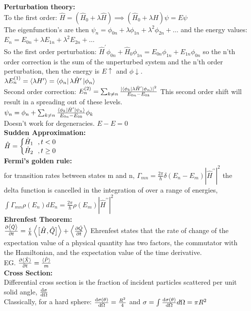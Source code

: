 \documentclass[10pt,landscape,a4paper]{article}
\newcommand{\minititle}[1]{\textbf{#1:}\\}
\renewcommand{\^}[1]{\ensuremath{\hat{#1}}}
\newcommand{\h}{\hbar}
\renewcommand{\-}[1]{\text{\sout{\ensuremath{#1}}}}
\begin{document}
\begin{multicols}{4}
	\minititle{Perturbation theory}
	To the first order: $ \^H = (\^H_0+\lambda\^H) \implies (\^H_0 + \lambda\^H)\psi = E\psi $\\
	The eigenfunction's are then $ \psi_n = \phi_{0n} + \lambda\phi_{1n} + \lambda^2\phi_{2n} + \ldots $ and the energy values: $ E_n = E_{0n} + \lambda E_{1n} + \lambda^2 E_{2n} + \ldots $\\
	So the first order perturbation: $ \^H^\prime\phi_{0n} + \^H_0\phi_{1n} = E_{0n}\phi_{1n}+E_{1n}\phi_{0n} $ so the n'th order correction is the sum of the unperturbed system and the n'th order perturbation, then the energy is $ E\uparrow $ and $ \phi\downarrow $.\\
	$ \lambda E^{(1)}_n = \expval{\lambda H^\prime} = \bra{\phi_n}\lambda\^H^\prime\ket{\phi_n} $\\
	Second order correction: $ E^{(2)}_n = \sum_{k\ne n} \frac{|\bra{\phi_k}\lambda\^H^\prime\ket{\phi_n}|^2}{E_{0n}-E_{0k}} $ This second order shift will result in a spreading out of these levels.\\
	$ \psi_n = \phi_n+\sum_{k\ne n}\frac{\bra{\phi_k}\^H^\prime\ket{\psi_n}}{E_{0n}-E_{0k}}\phi_k $\\
	Doesn't work for degeneracies. $ E-E = 0 $\\
	\minititle{Sudden Approximation}
	$ \^H = \left\{ \mqty{\^H_1~~,t<0 \\ \^H_2~~,t\ge 0} \right. $\\
	\minititle{Fermi's golden rule} for transition rates between states m and n, $ \Gamma_{mn} = \frac{2\pi}{\h}\delta(E_n-E_m)|\^H^{\prime\prime}|^2 $ the delta function is cancelled in the integration of over a range of energies, $ \int\Gamma_{mn}\rho(E_n)dE_n = \frac{2\pi}{\h}\rho(E_m)|\^H^{\prime\prime}|^2 $\\
	\minititle{Ehrenfest Theorem}
	$ \pdv{\expval{\^Q}}{t} = \frac{i}{\h}\expval{\comm\big{\^H}{\^Q}}+\expval{\pdv{\^Q}{t}} $
	Ehrenfest states that the rate of change of the expectation value of a physical quantity has two factors, the commutator with the Hamiltonian, and the expectation value of the time derivative.\\
	EG. $ \pdv{\expval*{\^X}}{t} = \frac{\expval*{\^P}}{m} $\\
	\minititle{Cross Section}
	Differential cross section is the fraction of incident particles scattered per unit solid angle, $ \dv{\sigma}{\Omega} $\\
	Classically, for a hard sphere: $ \dv{\sigma(\theta)}{\Omega} = \frac{R^2}{4} $ and $ \sigma = \int\dv{\sigma(\theta)}{\Omega}d\Omega = \pi R^2  $\\

\end{multicols}
\end{document}
